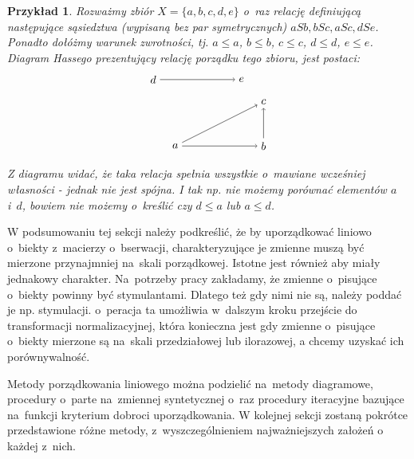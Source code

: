 \documentclass[12pt,a4paper]{report}
\newtheorem{example}{Przykład}
\begin{document}
\begin{example}
Rozważmy zbiór $X = \{a,b,c,d,e \}$ o~raz relację definiującą następujące sąsiedztwa (wypisaną bez par symetrycznych) $aSb, bSc, aSc, dSe$. Ponadto dołóżmy warunek zwrotności, tj. $a \leq a$, $b \leq b$, $c \leq c$, $d \leq d$, $e \leq e$. Diagram Hassego prezentujący relację porządku tego zbioru, jest postaci:
$$
\begin{tikzpicture}[scale=.7]
  \node (a) at (-2,0) {$a$};
  \node (b) at (2,0) {$b$};
  \node (c) at (2,2) {$c$};
 \node (e) at (1,3) {$e$};
 \node (d) at (-3,3) {$d$};
	\draw [->] (d)--(e);
	\draw [->] (a)--(b);
	\draw [->] (a)--(c);
	\draw [->] (b)--(c);
\end{tikzpicture}
$$
Z diagramu widać, że taka relacja spełnia wszystkie o~mawiane wcześniej własności - jednak nie jest spójna. I tak np. nie możemy porównać elementów $a$ i~$d$, bowiem nie możemy o~kreślić czy  $d \leq a$ lub $a \leq d$.
\end{example}



W podsumowaniu tej sekcji należy podkreślić, że by uporządkować liniowo o~biekty z~macierzy o~bserwacji, charakteryzujące je zmienne muszą być mierzone przynajmniej na~skali porządkowej. Istotne jest również aby miały jednakowy charakter. Na~potrzeby pracy zakładamy, że zmienne o~pisujące o~biekty powinny być stymulantami. Dlatego też gdy nimi nie są, należy poddać je np. stymulacji. o~peracja ta umożliwia w~dalszym kroku przejście do transformacji normalizacyjnej, która konieczna jest gdy zmienne o~pisujące o~biekty mierzone są na~skali przedziałowej lub ilorazowej, a chcemy uzyskać ich porównywalność.

Metody porządkowania liniowego można podzielić na~metody diagramowe, procedury o~parte na~zmiennej syntetycznej o~raz procedury iteracyjne bazujące na~funkcji kryterium dobroci uporządkowania. %
W kolejnej sekcji zostaną pokrótce przedstawione różne metody, z~wyszczególnieniem najważniejszych założeń o~ każdej z~nich.
\end{document}
